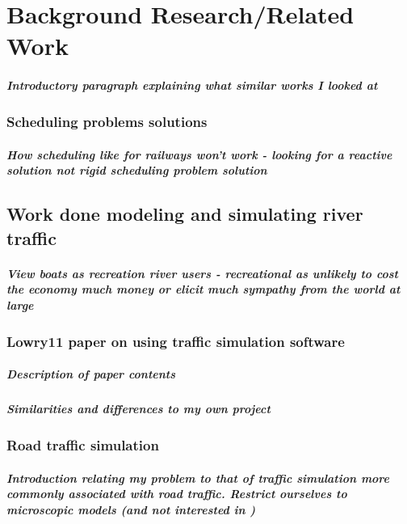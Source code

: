 \chapter{Background Research/Related Work}
  \paragraph{Introductory paragraph explaining what similar works I looked at}
  

  \subsection{Scheduling problems solutions}
    \paragraph{How scheduling like for railways won't work - looking for a reactive solution not rigid scheduling problem solution}

  \section{Work done modeling and simulating river traffic}
    \paragraph{View boats as recreation river users - recreational as unlikely to cost the economy much money or elicit much sympathy from the world at large}

    \subsection{Lowry11 paper on using traffic simulation software}
      \paragraph{Description of paper contents}
      \paragraph{Similarities and differences to my own project}
      
    \subsection{Road traffic simulation}
      \paragraph{Introduction relating my problem to that of traffic simulation more commonly associated with road traffic. Restrict ourselves to microscopic models (and not interested in )}
